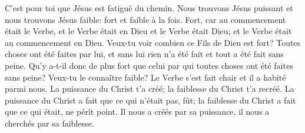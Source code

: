C’est pour toi que Jésus est fatigué du chemin.
	Nous trouvons Jésus puissant et nous trouvons Jésus faible:
	fort et faible à la fois.
Fort, car au commencement était le Verbe,
	et le Verbe était en Dieu et le Verbe était Dieu;
	et le Verbe était au commencement en Dieu.
Veux-tu voir combien ce Fils de Dieu est fort?
	Toutes choses ont été faites par lui,
	et sans lui rien n’a été fait et tout a été fait sans peine.
Qu’y a-t-il donc de plus fort
		que celui par qui toutes choses ont été faites sans peine?
Veux-tu le connaître faible?
	Le Verbe s’est fait chair et il a habité parmi nous.
La puissance du Christ t’a créé;
	la faiblesse du Christ t’a recréé.
La puissance du Christ a fait que ce qui n’était pas, fût;
	la faiblesse du Christ a fait que ce qui était, ne pérît point.
Il nous a créés par sa puissance,
	il nous a cherchés par sa faiblesse.
